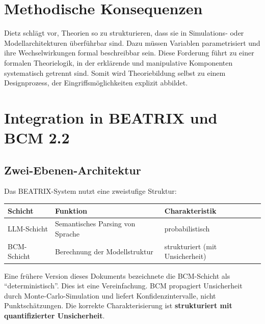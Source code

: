 \documentclass[12pt,a4paper]{article}
\begin{document}
\section{Methodische Konsequenzen}

Dietz schlägt vor, Theorien so zu strukturieren, dass sie in Simulations- oder Modellarchitekturen überführbar sind.
Dazu müssen Variablen parametrisiert und ihre Wechselwirkungen formal beschreibbar sein.
Diese Forderung führt zu einer formalen Theorielogik, in der erklärende und manipulative Komponenten systematisch getrennt sind.
Somit wird Theoriebildung selbst zu einem Designprozess, der Eingriffsmöglichkeiten explizit abbildet.

\section{Integration in BEATRIX und BCM 2.2}

\subsection{Zwei-Ebenen-Architektur}

Das BEATRIX-System nutzt eine zweistufige Struktur:

\begin{center}
\begin{tabular}{lll}
\toprule
\textbf{Schicht} & \textbf{Funktion} & \textbf{Charakteristik}\\
\midrule
LLM-Schicht & Semantisches Parsing von Sprache & probabilistisch\\
BCM-Schicht & Berechnung der Modellstruktur & strukturiert (mit Unsicherheit)\\
\bottomrule
\end{tabular}
\end{center}

\begin{tcolorbox}[colback=yellow!5!white, colframe=warnorange, title=Präzisierung: ``Deterministisch'' vs. ``Strukturiert'']
Eine frühere Version dieses Dokuments bezeichnete die BCM-Schicht als ``deterministisch''. Dies ist eine Vereinfachung. BCM propagiert Unsicherheit durch Monte-Carlo-Simulation und liefert Konfidenzintervalle, nicht Punktschätzungen. Die korrekte Charakterisierung ist \textbf{strukturiert mit quantifizierter Unsicherheit}.
\end{tcolorbox}
\end{document}

